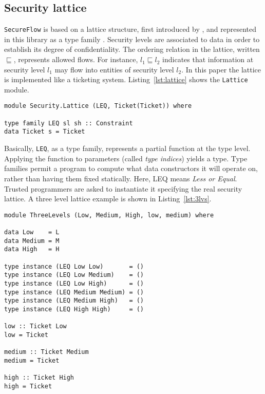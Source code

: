 \subsection{Security lattice}
\texttt{SecureFlow} is based on a lattice structure, first introduced by \citeauthor{denning1976lattice} \cite{denning1976lattice}, and represented in this library as a type family \cite{kiselyov2010fun}. Security levels are associated to data in order to establish its degree of confidentiality. The ordering relation in the lattice, written $\sqsubseteq$, represents allowed flows. For instance, $l_{1} \sqsubseteq l_{2}$ indicates that information at security level $l_{1}$ may flow into entities of security level $l_{2}$. In this paper the lattice is implemented like a ticketing system. Listing~\ref{lst:lattice} shows the \texttt{Lattice} module. 
\begin{lstlisting}[caption={The Lattice module}, label={lst:lattice}, breaklines=true]
module Security.Lattice (LEQ, Ticket(Ticket)) where

type family LEQ sl sh :: Constraint
data Ticket s = Ticket
\end{lstlisting}
Basically, \texttt{LEQ}, as a type family, represents a partial function at the type level. Applying the function to parameters (called \textit{type indices}) yields a type. Type families permit a program to compute what data constructors it will operate on, rather than having them fixed statically. Here, LEQ means \textit{Less or Equal}. Trusted programmers are asked to instantiate it specifying the real security lattice. A three level lattice example is shown in Listing~\ref{lst:3lvs}.
\begin{lstlisting}[caption={Three levels lattice}, label={lst:3lvs}, breaklines=true]
module ThreeLevels (Low, Medium, High, low, medium) where

data Low    = L
data Medium = M
data High   = H

type instance (LEQ Low Low)       = ()
type instance (LEQ Low Medium)    = ()
type instance (LEQ Low High)      = ()
type instance (LEQ Medium Medium) = ()
type instance (LEQ Medium High)   = ()
type instance (LEQ High High)     = ()

low :: Ticket Low
low = Ticket

medium :: Ticket Medium
medium = Ticket

high :: Ticket High
high = Ticket
\end{lstlisting}
